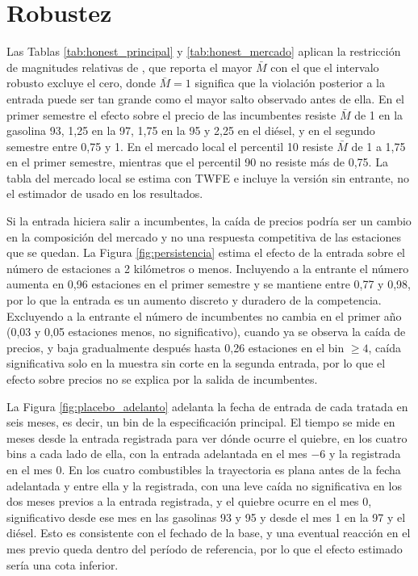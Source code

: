 \section{Robustez} \label{sec:robustez}

Las Tablas \ref{tab:honest_principal} y \ref{tab:honest_mercado} aplican la restricción de magnitudes relativas de \textcite{RAMBACHAN2023}, que reporta el mayor $\bar{M}$ con el que el intervalo robusto excluye el cero, donde $\bar{M} = 1$ significa que la violación posterior a la entrada puede ser tan grande como el mayor salto observado antes de ella. En el primer semestre el efecto sobre el precio de las incumbentes resiste $\bar{M}$ de 1 en la gasolina 93, 1,25 en la 97, 1,75 en la 95 y 2,25 en el diésel, y en el segundo semestre entre 0,75 y 1. En el mercado local el percentil 10 resiste $\bar{M}$ de 1 a 1,75 en el primer semestre, mientras que el percentil 90 no resiste más de 0,75. La tabla del mercado local se estima con TWFE e incluye la versión sin entrante, no el estimador de \textcite{SUNABRAHAM2021} usado en los resultados.

Si la entrada hiciera salir a incumbentes, la caída de precios podría ser un cambio en la composición del mercado y no una respuesta competitiva de las estaciones que se quedan. La Figura \ref{fig:persistencia} estima el efecto de la entrada sobre el número de estaciones a 2 kilómetros o menos. Incluyendo a la entrante el número aumenta en 0,96 estaciones en el primer semestre y se mantiene entre 0,77 y 0,98, por lo que la entrada es un aumento discreto y duradero de la competencia. Excluyendo a la entrante el número de incumbentes no cambia en el primer año (0,03 y 0,05 estaciones menos, no significativo), cuando ya se observa la caída de precios, y baja gradualmente después hasta 0,26 estaciones en el bin $\geq 4$, caída significativa solo en la muestra sin corte en la segunda entrada, por lo que el efecto sobre precios no se explica por la salida de incumbentes.

La Figura \ref{fig:placebo_adelanto} adelanta la fecha de entrada de cada tratada en seis meses, es decir, un bin de la especificación principal. El tiempo se mide en meses desde la entrada registrada para ver dónde ocurre el quiebre, en los cuatro bins a cada lado de ella, con la entrada adelantada en el mes $-6$ y la registrada en el mes 0. En los cuatro combustibles la trayectoria es plana antes de la fecha adelantada y entre ella y la registrada, con una leve caída no significativa en los dos meses previos a la entrada registrada, y el quiebre ocurre en el mes 0, significativo desde ese mes en las gasolinas 93 y 95 y desde el mes 1 en la 97 y el diésel. Esto es consistente con el fechado de la base, y una eventual reacción en el mes previo queda dentro del período de referencia, por lo que el efecto estimado sería una cota inferior.

